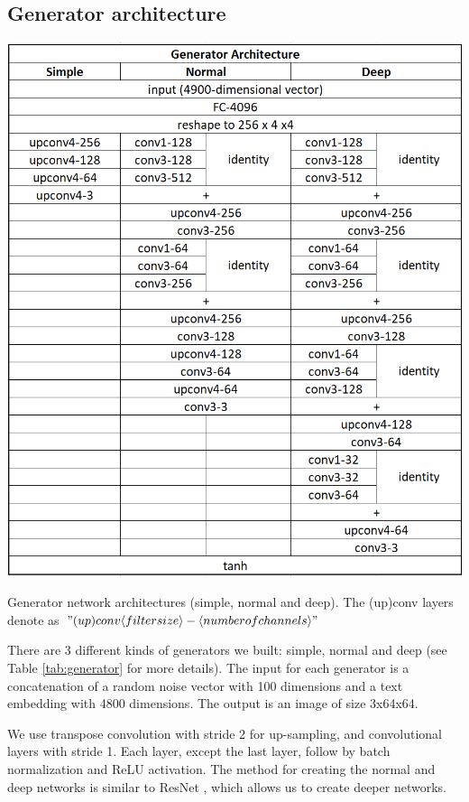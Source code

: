 \documentclass[a4paper]{article}
\begin{document}
\subsection{Generator architecture}
\begin{table}[ht]
    \centering
    \includegraphics[trim={0.03cm 0.01cm 0.01cm 0.03cm},clip,width=\textwidth]{generator.jpg}
    \caption{Generator network architectures (simple, normal and deep). The (up)conv layers denote as $"(up)conv\langle filter size \rangle - \langle number of channels\rangle"$}
    \label{tab:generator}
\end{table}
There are 3 different kinds of generators we built: simple, normal and deep (see Table \ref{tab:generator} for more details). The input for each generator is a concatenation of a random noise vector with 100 dimensions and a text embedding with 4800 dimensions. The output is an image of size 3x64x64.

We use transpose convolution with stride 2 for up-sampling, and convolutional layers with stride 1. Each layer, except the last layer, follow by batch normalization and ReLU activation. The method for creating the normal and deep networks is similar to ResNet \cite{he2016deep}, which allows us to create deeper networks.
\end{document}
